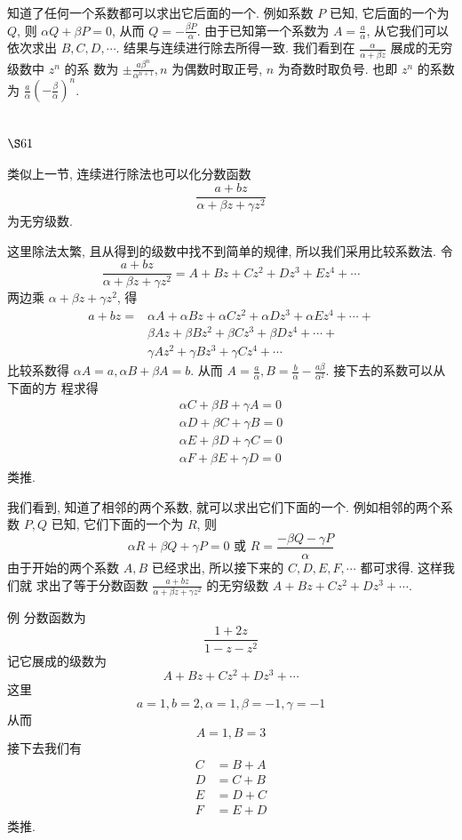 知道了任何一个系数都可以求出它后面的一个. 例如系数 $P$ 已知, 它后面的一个为 $Q$, 则 $\alpha Q+\beta P=0$, 从而 $Q=-\frac{\beta P}{\alpha}$. 由于已知第一个系数为 $A=\frac{a}{\alpha}$, 从它我们可以依次求出 $B, C, D, \cdots$. 结果与连续进行除去所得一致. 我们看到在 $\frac{\alpha}{\alpha+\beta z}$ 展成的无穷级数中 $z^{n}$ 的系 数为 $\pm \frac{a \beta^{n}}{\alpha^{n+1}}, n$ 为偶数时取正号, $n$ 为奇数时取负号. 也即 $z^{n}$ 的系数为 $\frac{a}{\alpha}\left(-\frac{\beta}{\alpha}\right)^{n}$.

\section{$\S 61$}

类似上一节, 连续进行除法也可以化分数函数
\[
\frac{a+b z}{\alpha+\beta z+\gamma z^{2}}
\]
为无穷级数.

这里除法太繁, 且从得到的级数中找不到简单的规律, 所以我们采用比较系数法. 令
\[
\frac{a+b z}{\alpha+\beta z+\gamma z^{2}}=A+B z+C z^{2}+D z^{3}+E z^{4}+\cdots
\]
两边乘 $\alpha+\beta z+\gamma z^{2}$, 得
\[
\begin{aligned}
a+b z= & \alpha A+\alpha B z+\alpha C z^{2}+\alpha D z^{3}+\alpha E z^{4}+\cdots+ \\
& \beta A z+\beta B z^{2}+\beta C z^{3}+\beta D z^{4}+\cdots+ \\
& \gamma A z^{2}+\gamma B z^{3}+\gamma C z^{4}+\cdots
\end{aligned}
\]
比较系数得 $\alpha A=a, \alpha B+\beta A=b$. 从而 $A=\frac{a}{\alpha}, B=\frac{b}{\alpha}-\frac{a \beta}{\alpha^{2}}$. 接下去的系数可以从下面的方 程求得 
\[
\begin{gathered}
\alpha C+\beta B+\gamma A=0 \\
\alpha D+\beta C+\gamma B=0 \\
\alpha E+\beta D+\gamma C=0 \\
\alpha F+\beta E+\gamma D=0
\end{gathered}
\]
类推.

我们看到, 知道了相邻的两个系数, 就可以求出它们下面的一个. 例如相邻的两个系 数 $P, Q$ 已知, 它们下面的一个为 $R$, 则
\[
\alpha R+\beta Q+\gamma P=0 \text { 或 } R=\frac{-\beta Q-\gamma P}{\alpha}
\]
由于开始的两个系数 $A, B$ 已经求出, 所以接下来的 $C, D, E, F, \cdots$ 都可求得. 这样我们就 求出了等于分数函数 $\frac{a+b z}{\alpha+\beta z+\gamma z^{2}}$ 的无穷级数 $A+B z+C z^{2}+D z^{3}+\cdots$.

例 分数函数为
\[
\frac{1+2 z}{1-z-z^{2}}
\]
记它展成的级数为
\[
A+B z+C z^{2}+D z^{3}+\cdots
\]
这里
\[
a=1, b=2, \alpha=1, \beta=-1, \gamma=-1
\]
从而
\[
A=1, B=3
\]
接下去我们有
\[
\begin{aligned}
C & =B+A \\
D & =C+B \\
E & =D+C \\
F & =E+D
\end{aligned}
\]
类推.

